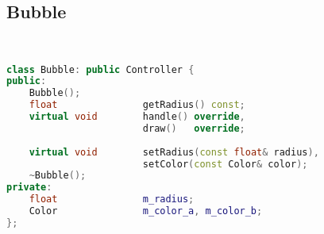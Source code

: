 \subsection{Bubble}
\begin{lstlisting}[language=C++]


class Bubble: public Controller {
public:
    Bubble();
    float               getRadius() const;
    virtual void        handle() override,
                        draw()   override;
    
    virtual void        setRadius(const float& radius),
                        setColor(const Color& color);
    ~Bubble();
private:
    float               m_radius;
    Color               m_color_a, m_color_b;
};






\end{lstlisting}
